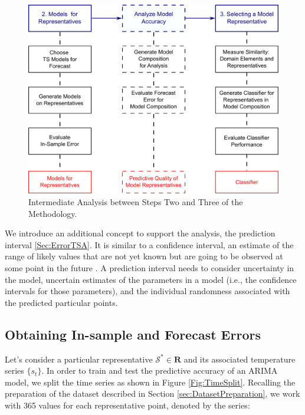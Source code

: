 \begin{figure}[h!]
	\centering
	\includegraphics[scale=0.18]{../Figures/Experiements_Methodology_Step2_Step3}
	\caption{Intermediate Analysis between Steps Two and Three of the Methodology.}
	\label{Fig:MethodologyExperiments}
\end{figure}

We introduce an additional concept to support the analysis, the prediction interval \ref{Sec:ErrorTSA}. It is similar to a confidence interval, an estimate of the range of likely values that are not yet known but are going to be observed at some point in the future \cite{Chatfield2001}. A prediction interval needs to consider uncertainty in the model, uncertain estimates of the parameters in a model (i.e., the confidence intervals for those parameters), and the individual randomness associated with the predicted particular points.

\subsection{Obtaining In-sample and Forecast Errors}
\label{sec:InSampleForecastErrors}

Let's consider a particular representative $\mathcal{S}^{*} \in \mathbf{R}$ and its associated temperature series $\lbrace s_t \rbrace$. In order to train and test the predictive accuracy of an ARIMA model, we split the time series as shown in Figure \ref{Fig:TimeSplit}. Recalling the preparation of the dataset described in Section \ref{sec:DatasetPreparation}, we work with 365 values for each representative point, denoted by the series:

